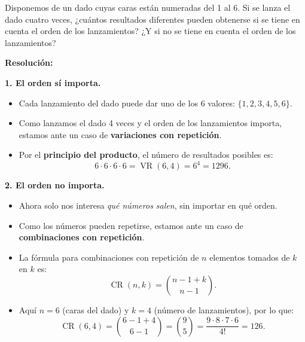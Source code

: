 \documentclass[a4paper,12pt]{article}
\begin{document}
\begin{ejercicio}[title=Ejercicio 26]
Disponemos de un dado cuyas caras están numeradas del 1 al 6. Si se lanza el dado cuatro veces, ¿cuántos resultados diferentes pueden obtenerse si se tiene en cuenta el orden de los lanzamientos? ¿Y si no se tiene en cuenta el orden de los lanzamientos?

\tcblower
\textbf{Resolución:}

\medskip
\textbf{1. El orden sí importa.}

\begin{itemize}
\item Cada lanzamiento del dado puede dar uno de los 6 valores: $\{1,2,3,4,5,6\}$.  
\item Como lanzamos el dado 4 veces y el orden de los lanzamientos importa, estamos ante un caso de \textbf{variaciones con repetición}.  
\item Por el \textbf{principio del producto}, el número de resultados posibles es:
\[
6 \cdot 6 \cdot 6 \cdot 6 = \operatorname{VR}(6,4) = 6^4 = \boxed{1296}.
\]
\end{itemize}

\medskip
\textbf{2. El orden no importa.}

\begin{itemize}
\item Ahora solo nos interesa \emph{qué números salen}, sin importar en qué orden.  
\item Como los números pueden repetirse, estamos ante un caso de \textbf{combinaciones con repetición}.  
\item La fórmula para combinaciones con repetición de $n$ elementos tomados de $k$ en $k$ es:
\[
\operatorname{CR}(n,k) = \binom{n-1+k}{n-1}.
\]
\item Aquí $n=6$ (caras del dado) y $k=4$ (número de lanzamientos), por lo que:
\[
\operatorname{CR}(6,4) = \binom{6-1+4}{6-1} = \binom{9}{5} = \frac{9\cdot8\cdot7\cdot6}{4!} = \boxed{126}.
\]
\end{itemize}

\end{ejercicio}
\end{document}
